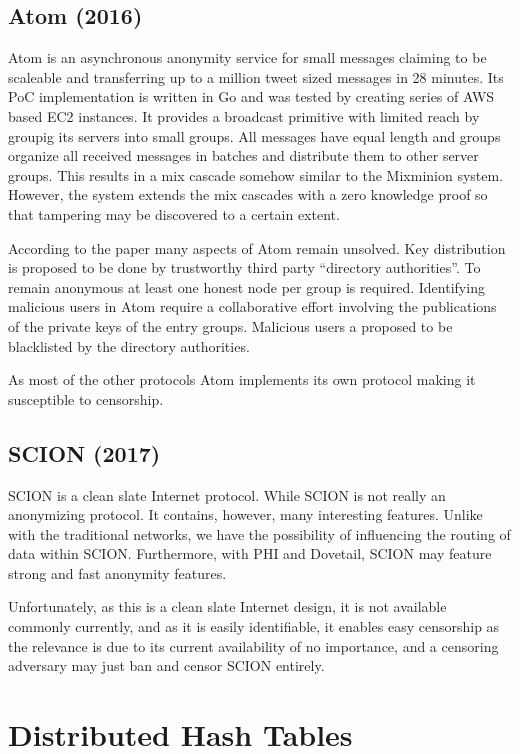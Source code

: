 \subsection{Atom (2016)}
Atom\cite{kwon2016atom} is an asynchronous anonymity service for small messages claiming to be scaleable and transferring up to a million tweet sized messages in 28 minutes. Its PoC implementation is written in Go and was tested by creating series of AWS based EC2 instances. It provides a broadcast primitive with limited reach by groupig its servers into small groups. All messages have equal length and groups organize all received messages in batches and distribute them to other server groups. This results in a mix cascade somehow similar to the Mixminion system. However, the system extends the mix cascades with a zero knowledge proof so that tampering may be discovered to a certain extent.

According to the paper many aspects of Atom remain unsolved. Key distribution is proposed to be done by trustworthy third party ``directory authorities''. To remain anonymous at least one honest node per group is required. Identifying malicious users in Atom require a collaborative effort involving the publications of the private keys of the entry groups. Malicious users a proposed to be blacklisted by the directory authorities. 

As most of the other protocols Atom implements its own protocol making it susceptible to censorship.


\subsection{SCION (2017)}
SCION\cite{perrig2017scion} is a clean slate Internet protocol. While SCION is not really an anonymizing protocol. It contains, however,  many interesting features. Unlike with the traditional networks, we have the possibility of influencing the routing of data within SCION. Furthermore, with PHI\cite{chen2017phi} and Dovetail\cite{sankey2014dovetail}, SCION may feature strong and fast anonymity features. 

Unfortunately, as this is a clean slate Internet design, it is not available commonly currently, and as it is easily identifiable, it enables easy censorship as the relevance is due to its current availability of no importance, and a censoring adversary may just ban and censor SCION entirely. 

\section{Distributed Hash Tables}
